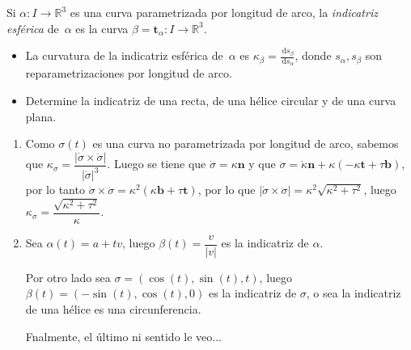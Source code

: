 \documentclass[11pt]{article}
\newcommand{\R}{{\mathbb{R}}}
\newcommand\dd{\,\mathrm{d}}
\newcommand\abs[1]{\left\lvert#1\right\rvert}
\renewcommand\tt{\mathbf{t}}
\newcommand\nn{\mathbf{n}}
\newcommand\bb{\mathbf{b}}                      %
\newenvironment{proof}[1][Demostraci\'on]{\begin{trivlist}
		\item[\hskip \labelsep {\bfseries #1}]}{\end{trivlist}}
\newcommand{\qed}{\nobreak \ifvmode \relax \else
	\ifdim\lastskip<1.5em \hskip-\lastskip
	\hskip1.5em plus0em minus0.5em \fi \nobreak
	\vrule height0.75em width0.5em depth0.25em\fi}
\begin{document}
\begin{enumerate}
\begin{proof}
\begin{enumerate}
			
		\end{enumerate}
		
	\end{proof}
	
	\item Si $\alpha:I\to\R^3$ es una curva parametrizada por longitud de arco, la
	\emph{indicatriz esf\'erica} de~$\alpha$ es la curva $\beta=\tt_\alpha:I\to\R^3$.
	\begin{itemize}
		
		\item La curvatura de la indicatriz esf\'erica de~$\alpha$ es $\kappa_\beta = \frac{\dd
			s_\beta }{\dd s_\alpha }$, donde $s_\alpha, s_\beta$ son reparametrizaciones por
		longitud de arco.
		
		\item Determine la indicatriz de una recta, de una h\'elice circular y de una curva plana.
	\end{itemize}
	
	\label{Ejercicio 12}
	
	\begin{proof}
		
		\begin{enumerate}
			
			\item Como $\sigma(t)$ es una curva no parametrizada por longitud de arco, sabemos que $\kappa_{\sigma} = \dfrac{\abs{\dot{\sigma} \times \ddot{\sigma} }}{\abs{\dot{\sigma}}^3}$. Luego se tiene que $\dot{\sigma} = \kappa \nn$ y que $\ddot{\sigma} = \dot{\kappa} \nn + \kappa (-\kappa \tt + \tau \bb)$, por lo tanto $\dot{\sigma} \times \ddot{\sigma} = \kappa^2 (\kappa \bb + \tau \tt)$, por lo que $\abs{\dot{\sigma} \times \ddot{\sigma} } = \kappa^2 \sqrt{ \kappa^2 + \tau^2}$, luego $\kappa_{\sigma} = \dfrac{\sqrt{ \kappa^2 + \tau^2}}{\kappa}$.
			
			\item Sea $\alpha(t) = a + tv$, luego $\beta(t) = \dfrac{v}{\abs{v}}$ es la indicatriz de $\alpha$.
			
			Por otro lado sea $\sigma = (\cos(t), \sin(t), t)$, luego $\beta(t) = (-\sin(t), \cos(t), 0)$ es la indicatriz de $\sigma$, o sea la indicatriz de una h\'elice es una circunferencia.
			
			Fnalmente, el \'ultimo ni sentido le veo... \qed
			 
		\end{enumerate}
		
	\end{proof}
	

\end{enumerate}
\end{document}
